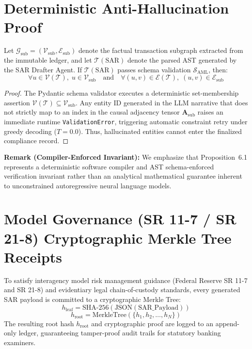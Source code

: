 \section{Deterministic Anti-Hallucination Proof}

\begin{proposition}\label{prop:anti_hallucination}
Let $\mathcal{G}_{\text{sub}} = (\mathcal{V}_{\text{sub}}, \mathcal{E}_{\text{sub}})$ denote the factual transaction subgraph extracted from the immutable ledger, and let $\mathcal{T}(\text{SAR})$ denote the parsed AST generated by the SAR Drafter Agent. If $\mathcal{T}(\text{SAR})$ passes schema validation $\mathcal{S}_{\text{AML}}$, then:
\begin{equation}
\forall u \in \mathcal{V}(\mathcal{T}), \; u \in \mathcal{V}_{\text{sub}} \quad \text{and} \quad \forall (u, v) \in \mathcal{E}(\mathcal{T}), \; (u, v) \in \mathcal{E}_{\text{sub}}
\end{equation}
\end{proposition}

\begin{proof}
The Pydantic schema validator executes a deterministic set-membership assertion $\mathcal{V}(\mathcal{T}) \subseteq \mathcal{V}_{\text{sub}}$. Any entity ID generated in the LLM narrative that does not strictly map to an index in the causal adjacency tensor $\mathbf{A}_{\text{sub}}$ raises an immediate runtime \texttt{ValidationError}, triggering automatic constraint retry under greedy decoding ($T=0.0$). Thus, hallucinated entities cannot enter the finalized compliance record.
\end{proof}

\textbf{Remark (Compiler-Enforced Invariant):} We emphasize that Proposition~6.1 represents a deterministic software compiler and AST schema-enforced verification invariant rather than an analytical mathematical guarantee inherent to unconstrained autoregressive neural language models.

\section{Model Governance (SR 11-7 / SR 21-8) Cryptographic Merkle Tree Receipts}
To satisfy interagency model risk management guidance (Federal Reserve SR 11-7 and SR 21-8) and evidentiary legal chain-of-custody standards, every generated SAR payload is committed to a cryptographic Merkle Tree:
\begin{equation}
h_{\text{leaf}} = \text{SHA-256}\left( \text{JSON}(\text{SAR\_Payload}) \right)
\end{equation}
\begin{equation}
h_{\text{root}} = \text{MerkleTree}(\{h_1, h_2, \dots, h_N\})
\end{equation}
The resulting root hash $h_{\text{root}}$ and cryptographic proof are logged to an append-only ledger, guaranteeing tamper-proof audit trails for statutory banking examiners.

